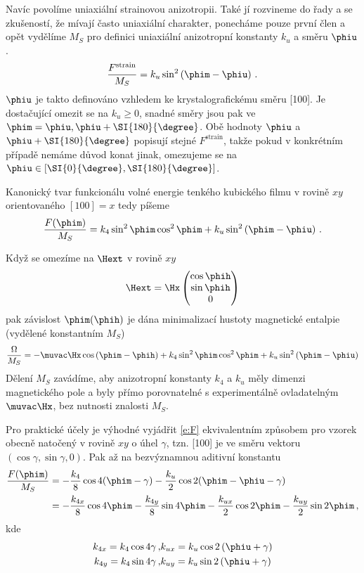 Navíc povolíme uniaxiální strainovou anizotropii. 
Také jí rozvineme do řady a se zkušeností, že mívají často uniaxiální charakter, ponecháme pouze první člen a opět vydělíme $M_S$ pro definici uniaxiální anizotropní konstanty $k_u$ a směru $\phiu$.
\begin{equation}
\frac{F^\textrm{strain}}{M_S}=k_u \sin^2\left( \phim-\phiu  \right) \,.
\end{equation}
$\phiu$ je takto definováno vzhledem ke krystalografickému směru [100].
Je dostačující omezit se na $k_u\geq 0$, snadné směry jsou pak ve $\phim=\phiu, \phiu+\SI{180}{\degree}$.
Obě hodnoty $\phiu$ a $\phiu+\SI{180}{\degree}$ popisují stejné $F^\textrm{strain}$, takže pokud v konkrétním případě nemáme důvod konat jinak, omezujeme se na $\phiu \in [\SI{0}{\degree}, \SI{180}{\degree}]$.

Kanonický tvar funkcionálu volné energie tenkého kubického filmu v rovině $xy$ orientovaného $[100]=x$ tedy píšeme
\begin{equation} \label{e:F}
\frac{F(\phim)}{M_S}=k_4 \sin^2 \phim \cos^2 \phim + k_u \sin^2\left( \phim-\phiu  \right) \,.
\end{equation}

Když se omezíme na $\Hext$ v rovině $xy$
\begin{equation}
\Hext =\Hx \begin{pmatrix} \cos \phih \\ \sin \phih \\ 0 \end{pmatrix}
\end{equation}
pak závislost $\phim(\phih)$ je dána minimalizací hustoty magnetické entalpie (vydělené konstantním $M_S$)
\begin{equation}
\frac{\Omega}{M_S}=-\muvac \Hx \cos \left(\phim-\phih \right) + k_4 \sin^2 \phim \cos^2 \phim + k_u \sin^2\left( \phim-\phiu  \right)
\end{equation}
Dělení $M_S$ zavádíme, aby anizotropní konstanty $k_4$ a $k_u$ měly dimenzi magnetického pole a byly přímo porovnatelné s experimentálně ovladatelným $\muvac\Hx$, bez nutnosti znalosti $M_S$.

Pro praktické účely je výhodné vyjádřit \eqref{e:F} ekvivalentním způsobem pro vzorek obecně natočený v rovině $xy$ o úhel $\gamma$, tzn. [100] je ve směru vektoru $(\cos\gamma, \sin\gamma, 0)$.
Pak až na bezvýznamnou aditivní konstantu
\begin{align}
\frac{F(\phim)}{M_S}&=-\frac{k_4}{8} \cos 4(\phim-\gamma)-\frac{k_u}{2} \cos 2(\phim-\phiu-\gamma) \\
&=-\frac{k_{4x}}{8} \cos 4\phim - \frac{k_{4y}}{8} \sin 4\phim - \frac{k_{ux}}{2} \cos 2 \phim - \frac{k_{uy}}{2} \sin 2 \phim \,,
\end{align}
kde
\begin{eqnarray}
k_{4x}=k_4 \cos 4\gamma \,, & k_{ux}=k_u \cos 2 \left(\phiu+\gamma\right)\\
k_{4y}=k_4 \sin 4\gamma \,, & k_{uy}=k_u \sin 2 \left(\phiu+\gamma\right)
\end{eqnarray}


